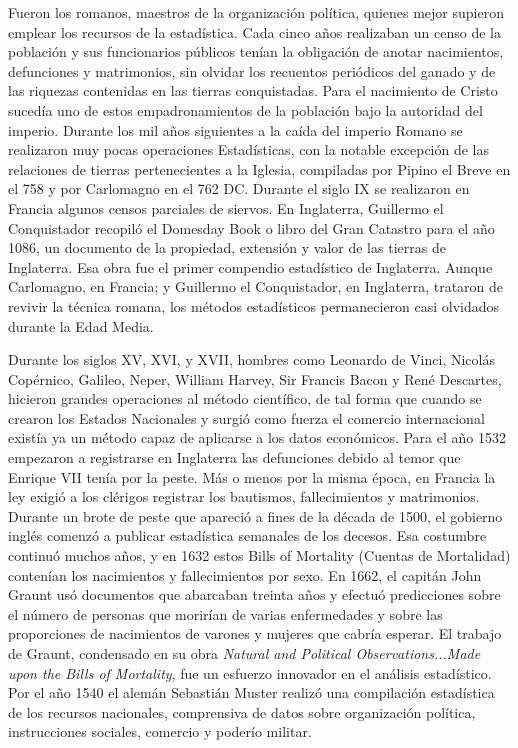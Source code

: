 \documentclass[a4paper]{report} %
\begin{document}
Fueron los romanos, maestros de la organizaci\'on pol\'itica, quienes mejor supieron emplear los recursos de la estad\'istica. Cada cinco a\~nos realizaban un censo de la poblaci\'on y sus funcionarios p\'ublicos ten\'ian la obligaci\'on de anotar nacimientos, defunciones y matrimonios, sin olvidar los recuentos peri\'odicos del ganado y de las riquezas contenidas en las tierras conquistadas. Para el nacimiento de Cristo suced\'ia uno de estos empadronamientos de la poblaci\'on bajo la autoridad del imperio. Durante los mil a\~nos siguientes a la ca\'ida del imperio Romano se realizaron muy pocas operaciones Estad\'isticas, con la notable excepci\'on de las relaciones de tierras pertenecientes a la Iglesia, compiladas por Pipino el Breve en el 758 y por Carlomagno en el 762 DC. Durante el siglo IX se realizaron en Francia algunos censos parciales de siervos. En Inglaterra, Guillermo el Conquistador recopil\'o el Domesday Book o libro del Gran Catastro para el a\~no 1086, un documento de la propiedad, extensi\'on y valor de las tierras de Inglaterra. Esa obra fue el primer compendio estad\'istico de Inglaterra.  Aunque Carlomagno, en Francia; y Guillermo el Conquistador, en Inglaterra, trataron de revivir la t\'ecnica romana, los m\'etodos estad\'isticos permanecieron casi olvidados durante la Edad Media.


Durante los siglos XV, XVI, y XVII, hombres como Leonardo de Vinci, Nicol\'as Cop\'ernico, Galileo, Neper, William Harvey, Sir Francis Bacon y Ren\'e Descartes, hicieron grandes operaciones al m\'etodo cient\'ifico, de tal forma que cuando se crearon los Estados Nacionales y surgi\'o como fuerza el comercio internacional exist\'ia ya un m\'etodo capaz de aplicarse a los datos econ\'omicos. Para el a\~no 1532 empezaron a registrarse en Inglaterra las defunciones debido al temor que Enrique VII ten\'ia por la peste.  M\'as o menos por la misma \'epoca, en Francia la ley exigi\'o a los cl\'erigos registrar los bautismos, fallecimientos y matrimonios. Durante un brote de peste que apareci\'o a fines de la d\'ecada de 1500, el gobierno ingl\'es comenz\'o a publicar estad\'istica semanales de los decesos. Esa costumbre continu\'o muchos a\~nos, y en 1632 estos Bills of Mortality (Cuentas de Mortalidad) conten\'ian los nacimientos y fallecimientos por sexo. En 1662, el capit\'an John Graunt us\'o documentos que abarcaban treinta a\~nos y efectu\'o predicciones sobre el n\'umero de personas que morir\'ian de varias enfermedades y sobre las proporciones de nacimientos de varones y mujeres que cabr\'ia esperar. El trabajo de Graunt, condensado en su obra \textit{Natural and Political Observations...Made upon the Bills of Mortality}, fue un esfuerzo innovador en el an\'alisis estad\'istico. Por el a\~no 1540 el alem\'an Sebasti\'an Muster realiz\'o una compilaci\'on estad\'istica de los recursos nacionales, comprensiva de datos sobre organizaci\'on pol\'itica, instrucciones sociales, comercio y poder\'io militar. 
\end{document}
